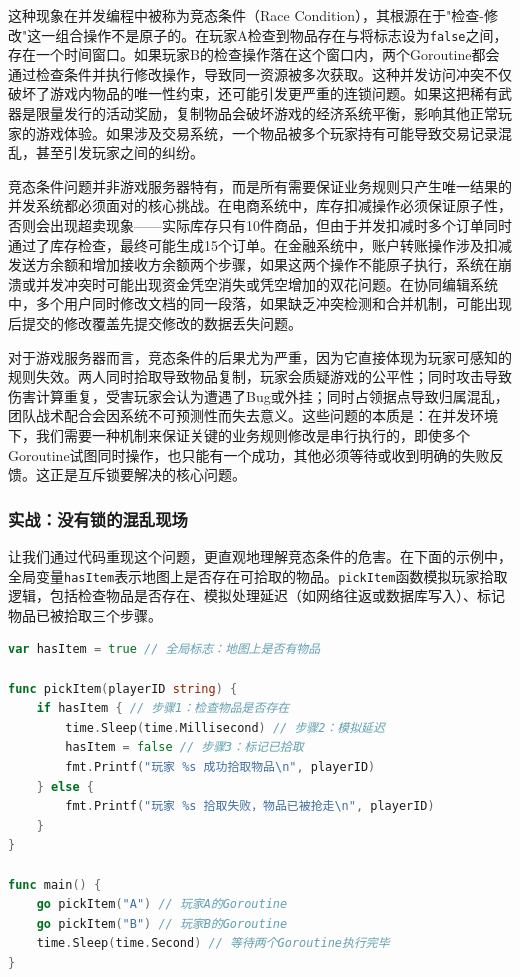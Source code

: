 这种现象在并发编程中被称为竞态条件（Race Condition），其根源在于"检查-修改"这一组合操作不是原子的。在玩家A检查到物品存在与将标志设为\texttt{false}之间，存在一个时间窗口。如果玩家B的检查操作落在这个窗口内，两个Goroutine都会通过检查条件并执行修改操作，导致同一资源被多次获取。这种并发访问冲突不仅破坏了游戏内物品的唯一性约束，还可能引发更严重的连锁问题。如果这把稀有武器是限量发行的活动奖励，复制物品会破坏游戏的经济系统平衡，影响其他正常玩家的游戏体验。如果涉及交易系统，一个物品被多个玩家持有可能导致交易记录混乱，甚至引发玩家之间的纠纷。

竞态条件问题并非游戏服务器特有，而是所有需要保证业务规则只产生唯一结果的并发系统都必须面对的核心挑战。在电商系统中，库存扣减操作必须保证原子性，否则会出现超卖现象——实际库存只有10件商品，但由于并发扣减时多个订单同时通过了库存检查，最终可能生成15个订单。在金融系统中，账户转账操作涉及扣减发送方余额和增加接收方余额两个步骤，如果这两个操作不能原子执行，系统在崩溃或并发冲突时可能出现资金凭空消失或凭空增加的双花问题。在协同编辑系统中，多个用户同时修改文档的同一段落，如果缺乏冲突检测和合并机制，可能出现后提交的修改覆盖先提交修改的数据丢失问题。

对于游戏服务器而言，竞态条件的后果尤为严重，因为它直接体现为玩家可感知的规则失效。两人同时拾取导致物品复制，玩家会质疑游戏的公平性；同时攻击导致伤害计算重复，受害玩家会认为遭遇了Bug或外挂；同时占领据点导致归属混乱，团队战术配合会因系统不可预测性而失去意义。这些问题的本质是：在并发环境下，我们需要一种机制来保证关键的业务规则修改是串行执行的，即使多个Goroutine试图同时操作，也只能有一个成功，其他必须等待或收到明确的失败反馈。这正是互斥锁要解决的核心问题。

\subsubsection{实战：没有锁的混乱现场}

让我们通过代码重现这个问题，更直观地理解竞态条件的危害。在下面的示例中，全局变量\texttt{hasItem}表示地图上是否存在可拾取的物品。\texttt{pickItem}函数模拟玩家拾取逻辑，包括检查物品是否存在、模拟处理延迟（如网络往返或数据库写入）、标记物品已被拾取三个步骤。

\begin{tcolorbox}[title=危险代码：缺乏同步保护的并发访问]
\begin{lstlisting}[style=codeblock, language=go]
var hasItem = true // 全局标志：地图上是否有物品

func pickItem(playerID string) {
    if hasItem { // 步骤1：检查物品是否存在
        time.Sleep(time.Millisecond) // 步骤2：模拟延迟
        hasItem = false // 步骤3：标记已拾取
        fmt.Printf("玩家 %s 成功拾取物品\n", playerID)
    } else {
        fmt.Printf("玩家 %s 拾取失败，物品已被抢走\n", playerID)
    }
}

func main() {
    go pickItem("A") // 玩家A的Goroutine
    go pickItem("B") // 玩家B的Goroutine
    time.Sleep(time.Second) // 等待两个Goroutine执行完毕
}
\end{lstlisting}
\end{tcolorbox}

